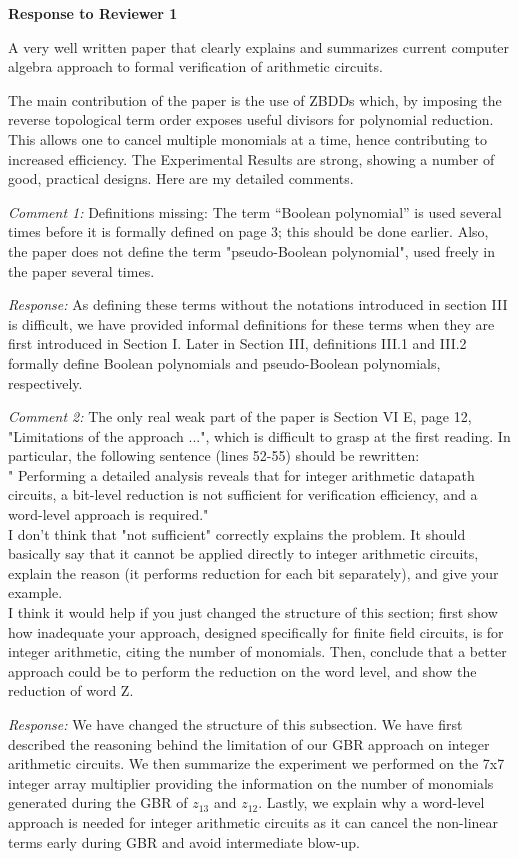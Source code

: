 \documentclass[conference, onecolumn]{IEEEtran}
\begin{document}
\begin{center}
{\bf \large Response to Reviewer 1}
\end{center}  
\vspace{0.1in}
\par A very well written paper that clearly explains and summarizes current computer algebra approach to formal verification of arithmetic circuits.
\par The main contribution of the paper is the use of ZBDDs which, by imposing the reverse topological term order exposes useful divisors for polynomial reduction. This allows one to cancel multiple monomials at a time, hence contributing to increased efficiency.   The Experimental Results are strong, showing a number of good, practical designs. Here are my detailed comments.
\par{\it Comment 1:} Definitions missing:
The term ``Boolean polynomial'' is used several times before it is formally defined on page 3; this should be done earlier. Also, the paper does not define the term "pseudo-Boolean polynomial", used freely in the paper several times.
\par{\it Response:} As defining these terms without the notations introduced in section III is difficult, we have provided informal definitions for these terms when they are first introduced in Section I. Later in Section III, definitions III.1 and III.2 formally define Boolean polynomials and pseudo-Boolean polynomials, 
respectively.

\par{\it Comment 2:} The only real weak part of the paper is Section VI E, page 12, "Limitations of the approach ...", which is difficult to grasp at the first reading. In particular, the following sentence (lines 52-55) should be rewritten:\\
" Performing a detailed analysis reveals that for integer arithmetic datapath circuits, a bit-level reduction is not sufficient for verification efficiency, and a word-level approach is required."\\
I don't think that "not sufficient" correctly explains the problem. It
should basically say that it cannot be applied directly to integer
arithmetic circuits, explain the reason (it performs reduction for
each bit separately), and give your example.\\ 
I think it would help if you just changed the structure of this
section; first show how inadequate your approach, designed
specifically for finite field circuits, is for integer arithmetic,
citing the number of monomials.  Then, conclude that a better approach
could be to perform the reduction on the word level, and show the
reduction of word Z. 
\par{\it Response:} We have changed the structure of this
subsection. We have first described the reasoning behind the
limitation of our GBR approach on integer arithmetic circuits. 
We then summarize the experiment we performed on the 7x7 integer array
multiplier providing the information on the number of monomials
generated during the GBR of $z_{13}$ and $z_{12}$.  Lastly, we explain
why a word-level approach is needed for integer arithmetic circuits as
it can  cancel the non-linear terms early during GBR and avoid
intermediate blow-up.  
\end{document}
